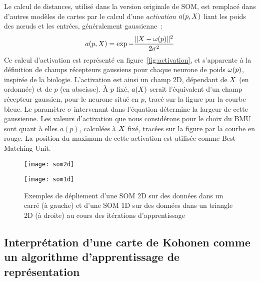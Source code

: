 \documentclass[../main]{subfiles}
\begin{document}
Le calcul de distances, utilisé dans la version originale de SOM, est remplacé dans d'autres modèles de cartes par le calcul d'une \emph{activation} $a(p, X)$ liant les poids des n\oe{}uds et les entrées, généralement gaussienne~:
\begin{equation}\label{eq:activation}
    a(p, X) = \exp{-\frac{\lVert X- \omega(p)\rVert^2}{2\sigma^2}}
\end{equation}
Ce calcul d'activation est représenté en figure~\ref{fig:activation}, et s'apparente à la définition de champs récepteurs gaussiens pour chaque neurone de poids $\omega(p)$, inspirée de la biologie.
L'activation est ainsi un champ 2D, dépendant de $X$ (en ordonnée) et de $p$ (en abscisse). \`A $p$ fixé, $a(X)$ serait l'équivalent d'un champ récepteur gaussien, pour le neurone situé en $p$, tracé sur la figure par la courbe bleue. Le paramètre $\sigma$ intervenant dans l'équation détermine la largeur de cette gaussienne.
Les valeurs d'activation que nous considérons pour le choix du BMU sont quant à elles $a(p)$, calculées à $X$ fixé, tracées sur la figure par la courbe en rouge. La position du maximum de cette activation est utilisée comme Best Matching Unit.

\begin{figure}
\begin{minipage}{0.5\textwidth}
\centering
\texttt{[image: som2d]}
\end{minipage}
\begin{minipage}{0.5\textwidth}
\centering
\texttt{[image: som1d]}
\end{minipage}
\caption{Exemples de dépliement d'une SOM 2D sur des données dans un carré (à gauche) et d'une SOM 1D sur des données dans un triangle 2D (à droite) au cours des itérations d'apprentissage \parencite{Kohonen1995SelfOrganizingM}\label{fig:som1d}}
\end{figure}
    
\subsection{Interprétation d'une carte de Kohonen comme un algorithme d'apprentissage de représentation}
\end{document}
